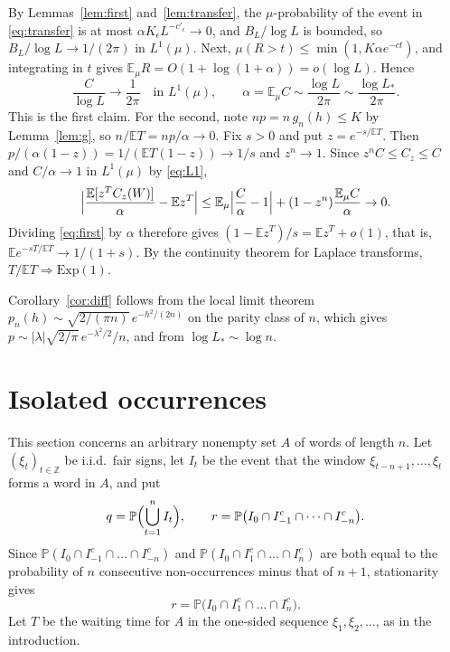 \documentclass[11pt]{amsart}
\theoremstyle{remark}
\numberwithin{equation}{section}
\newcommand{\PP}{\mathbb{P}}
\newcommand{\EE}{\mathbb{E}}
\newcommand{\Z}{\mathbb{Z}}
\begin{document}
By Lemmas~\ref{lem:first} and~\ref{lem:transfer}, the $\mu$-probability of the event in \eqref{eq:transfer} is at most $\alpha K_\epsilon L^{-c'_\epsilon}\to0$, and $B_L/\log L$ is bounded, so $B_L/\log L\to1/(2\pi)$ in $L^1(\mu)$. Next, $\mu(R>t)\le\min(1,K\alpha e^{-ct})$, and integrating in $t$ gives $\EE_\mu R=O(1+\log(1+\alpha))=o(\log L)$. Hence
\begin{equation}\label{eq:L1}
\frac C{\log L}\to\frac1{2\pi}\quad\text{in }L^1(\mu),\qquad\alpha=\EE_\mu C\sim\frac{\log L}{2\pi}\sim\frac{\log L_*}{2\pi}.
\end{equation}
This is the first claim. For the second, note $np=n\,g_n(h)\le K$ by Lemma~\ref{lem:g}, so $n/\EE T=np/\alpha\to0$. Fix $s>0$ and put $z=e^{-s/\EE T}$. Then $p/(\alpha(1-z))=1/(\EE T(1-z))\to1/s$ and $z^n\to1$. Since $z^nC\le C_z\le C$ and $C/\alpha\to1$ in $L^1(\mu)$ by \eqref{eq:L1},
\[
\Bigl|\frac{\EE[z^TC_z(W)]}{\alpha}-\EE z^T\Bigr|\le\EE_\mu\Bigl|\frac C\alpha-1\Bigr|+(1-z^n)\frac{\EE_\mu C}{\alpha}\to0.
\]
Dividing \eqref{eq:first} by $\alpha$ therefore gives $(1-\EE z^T)/s=\EE z^T+o(1)$, that is, $\EE e^{-sT/\EE T}\to1/(1+s)$. By the continuity theorem for Laplace transforms, $T/\EE T\Rightarrow\mathrm{Exp}(1)$.

Corollary~\ref{cor:diff} follows from the local limit theorem $p_n(h)\sim\sqrt{2/(\pi n)}\,e^{-h^2/(2n)}$ on the parity class of $n$, which gives $p\sim|\lambda|\sqrt{2/\pi}\,e^{-\lambda^2/2}/n$, and from $\log L_*\sim\log n$.

\section{Isolated occurrences}\label{sec:window}

This section concerns an arbitrary nonempty set $A$ of words of length $n$. Let $(\xi_t)_{t\in\Z}$ be i.i.d.\ fair signs, let $I_t$ be the event that the window $\xi_{t-n+1},\dots,\xi_t$ forms a word in $A$, and put
\[
q=\PP\Bigl(\bigcup_{t=1}^nI_t\Bigr),\qquad r=\PP\bigl(I_0\cap I_{-1}^c\cap\dots\cap I_{-n}^c\bigr).
\]
Since $\PP(I_0\cap I_{-1}^c\cap\dots\cap I_{-n}^c)$ and $\PP(I_0\cap I_1^c\cap\dots\cap I_n^c)$ are both equal to the probability of $n$ consecutive non-occurrences minus that of $n+1$, stationarity gives
\begin{equation}\label{eq:future}
r=\PP\bigl(I_0\cap I_1^c\cap\dots\cap I_n^c\bigr).
\end{equation}
Let $T$ be the waiting time for $A$ in the one-sided sequence $\xi_1,\xi_2,\dots$, as in the introduction.
\end{document}
